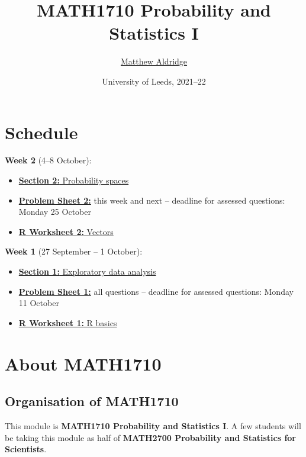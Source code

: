 \documentclass[
  a4paper,
]{book}
\title{MATH1710 Probability and Statistics I}
\author{\href{mailto:math1710@leeds.ac.uk}{Matthew Aldridge}}
\date{University of Leeds, 2021--22}
\providecommand{\tightlist}{%
  \setlength{\itemsep}{0pt}\setlength{\parskip}{0pt}}
\theoremstyle{definition}
\theoremstyle{definition}
\theoremstyle{definition}
\theoremstyle{definition}
\theoremstyle{remark}
\begin{document}
\maketitle

{
\setcounter{tocdepth}{1}
\tableofcontents
}
\hypertarget{schedule}{%
\chapter*{Schedule}\label{schedule}}

\textbf{Week 2} (4--8 October):

\begin{itemize}
\tightlist
\item
  \protect\hyperlink{S02-probability}{\textbf{Section 2:} Probability spaces}
\item
  \protect\hyperlink{P2}{\textbf{Problem Sheet 2:}} this week and next -- deadline for assessed questions: Monday 25 October
\item
  \protect\hyperlink{r-work}{\textbf{R Worksheet 2:} Vectors}
\end{itemize}

\textbf{Week 1} (27 September -- 1 October):

\begin{itemize}
\tightlist
\item
  \protect\hyperlink{S01-eda}{\textbf{Section 1:} Exploratory data analysis}
\item
  \protect\hyperlink{P1}{\textbf{Problem Sheet 1:}} all questions -- deadline for assessed questions: Monday 11 October
\item
  \protect\hyperlink{r-work}{\textbf{R Worksheet 1:} R basics}
\end{itemize}

\hypertarget{about}{%
\chapter*{About MATH1710}\label{about}}

\hypertarget{organisation}{%
\section*{Organisation of MATH1710}\label{organisation}}

This module is \textbf{MATH1710 Probability and Statistics I}. A few students will be taking this module as half of \textbf{MATH2700 Probability and Statistics for Scientists}.
\end{document}
